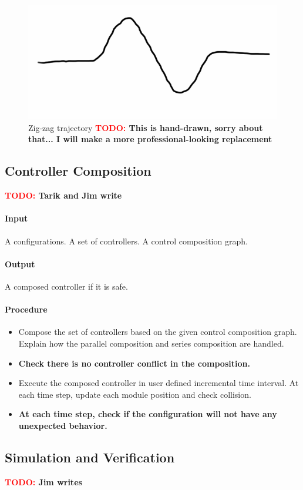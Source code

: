 \documentclass[conference]{IEEEtran}
\theoremstyle{definition}
\newcommand{\TODO}[1]{ {\bf \textcolor{red}{TODO:} #1 }}
\begin{document}
\begin{figure}
\begin{center}
\includegraphics[width=0.7\columnwidth]{images/zigzag.png}
\end{center}
\caption{Zig-zag trajectory \TODO{This is hand-drawn, sorry about that... I will
make a more professional-looking replacement}}
\label{fig:zigzag}
\end{figure}
 
\subsection{Controller Composition}
\TODO{Tarik and Jim write}
\paragraph{Input}
A configurations. A set of controllers. A control composition graph.
\paragraph{Output}
A composed controller if it is safe.
\paragraph{Procedure}
\begin{itemize}
\item Compose the set of controllers based on the given control composition graph. Explain how the parallel composition and series composition are handled.
\item\textbf{Check there is no controller conflict in the composition.}
\item Execute the composed controller in user defined incremental time interval. At each time step, update each module position and check collision.
\item \textbf{At each time step, check if the configuration will not have any unexpected behavior.}
\end{itemize}

\subsection{Simulation and Verification}
\TODO{Jim writes}
\end{document}
